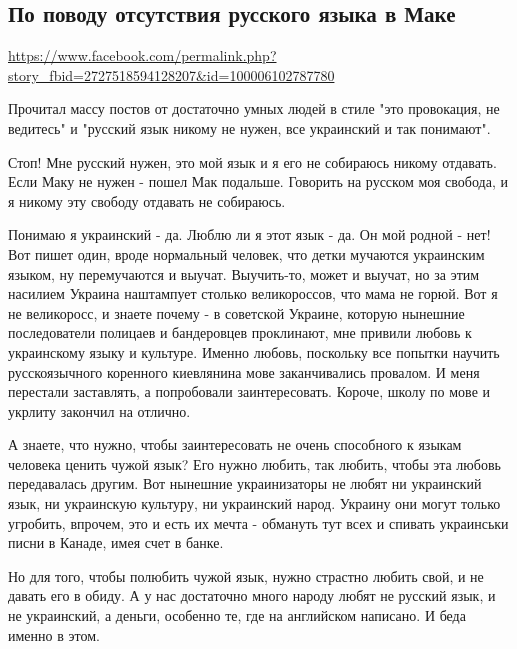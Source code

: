  
 
 
 
 

\subsection{По поводу отсутствия русского языка в Маке}
\label{sec:16_06_2020.fb.zharkih_denis.1.jazyk_macdonalds}
\url{https://www.facebook.com/permalink.php?story_fbid=2727518594128207&id=100006102787780}

Прочитал массу постов от достаточно умных людей в стиле "это провокация, не
ведитесь" и "русский язык никому не нужен, все украинский и так понимают".

Стоп! Мне русский нужен, это мой язык и я его не собираюсь никому отдавать.
Если Маку не нужен - пошел Мак подальше. Говорить на русском моя свобода, и я
никому эту свободу отдавать не собираюсь. 

Понимаю я украинский - да. Люблю ли я этот язык - да. Он мой родной - нет! Вот
пишет один, вроде нормальный человек, что детки мучаются украинским языком, ну
перемучаются и выучат. Выучить-то, может и выучат, но за этим насилием Украина
наштампует столько великороссов, что мама не горюй. Вот я не великоросс, и
знаете почему - в советской Украине, которую нынешние последователи полицаев и
бандеровцев проклинают, мне привили любовь к украинскому языку и культуре.
Именно любовь, поскольку все попытки научить русскоязычного коренного
киевлянина мове заканчивались провалом. И меня перестали заставлять, а
попробовали заинтересовать. Короче, школу по мове и укрлиту закончил на
отлично. 

А знаете, что нужно, чтобы заинтересовать не очень способного к языкам человека
ценить чужой язык? Его нужно любить, так любить, чтобы эта любовь передавалась
другим. Вот нынешние украинизаторы не любят ни украинский язык, ни украинскую
культуру, ни украинский народ. Украину они могут только угробить, впрочем, это
и есть их мечта - обмануть тут всех и спивать украинськи писни в Канаде, имея
счет в банке. 

Но для того, чтобы полюбить чужой язык, нужно страстно любить свой, и не давать
его в обиду. А у нас достаточно много народу любят не русский язык, и не
украинский, а деньги, особенно те, где на английском написано. И беда именно в
этом.


